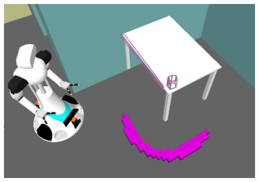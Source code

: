 \documentclass[t]{beamer}
\begin{document}
\begin{frame}
\begin{columns}
\begin{column}{0.5\textwidth}
\begin{center}
{						  \includegraphics[width=0.75\linewidth]{Figures/constraint_grasp}}
			\end{center}
		\end{column}				
	\end{columns}
\end{frame}
\end{document}
